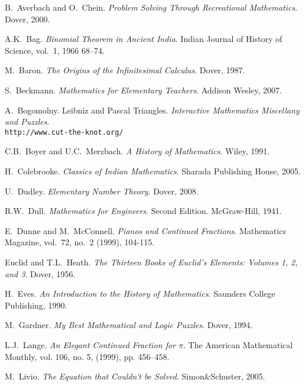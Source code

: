 



\begin{fullwidth}

\begin{thebibliography}{99}

 B.\ Averbach and O.\ Chein. \emph{Problem Solving Through Recreational Mathematics}. Dover, 2000.

 A.K.\ Bag. \emph{Binomial Theorem in Ancient India}. Indian Journal of History of Science, vol.\ 1,  1966 68--74. 

 M.\ Baron. \emph{The Origins of the Infinitesimal Calculus}. Dover, 1987.

 S.\ Beckmann. \emph{Mathematics for Elementary
  Teachers}. Addison Wesley, 2007.

 A.\ Bogomolny. Leibniz and Pascal Triangles. \emph{Interactive Mathematics Miscellany and Puzzles}.
\\ \texttt{http://www.cut-the-knot.org/}

 C.B.\ Boyer and U.C.\ Merzbach. \emph{A History of Mathematics}. Wiley, 1991.

 H.\ Colebrooke. \emph{Classics of Indian Mathematics}. 
Sharada Publishing House, 2005.

 U.\ Dudley. \emph{Elementary Number Theory}. Dover,
  2008.

 R.W.\ Dull. \emph{Mathematics for Engineers}. Second
  Edition. McGraw-Hill, 1941.

E.\ Dunne and M.\ McConnell. \emph{Pianos and Continued
Fractions}. Mathematics Magazine, vol.\ 72, no.\ 2 (1999), 104-115.

 Euclid and T.L.\ Heath. \emph{The Thirteen Books of Euclid's Elements: Volumes 1, 2, and 3}. Dover, 1956. 

 H.\ Eves. \emph{An Introduction to the History of Mathematics}. Saunders College Publishing, 1990.

 M.\ Gardner. \emph{My Best Mathematical and Logic
  Puzzles}. Dover, 1994.

 L.J.\ Lange. \emph{An Elegant Continued Fraction for {$\pi$}}. The American Mathematical Monthly, vol. 106, no. 5, (1999), pp. 456--458.

 M.\ Livio. \emph{The Equation that Couldn't be
  Solved}. Simon\&Schuster, 2005.


\end{thebibliography}
\end{fullwidth}
